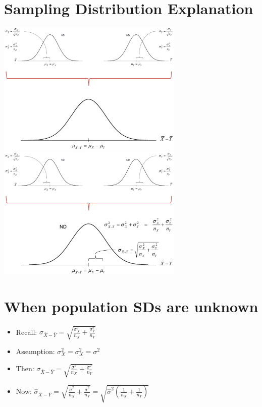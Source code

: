 \documentclass[12pt]{article}
\begin{document}
\section{Sampling Distribution
Explanation}\label{sampling-distribution-explanation}

\includegraphics[width=3.5in]{samp_dist_2samp_comb.png}
\includegraphics[width=3.5in]{samp_dist_2samp_comb_all.png}

\section{When population SDs are
unknown}\label{when-population-sds-are-unknown}

\begin{itemize}
\itemsep1pt\parskip0pt
\item
  Recall:
  \(\sigma_{\bar{X} - \bar{Y}} = \sqrt{\frac{\sigma_{X}^{2}}{n_{X}} + \frac{\sigma_{Y}^{2}}{n_{Y}}}\)
\item
  Assumption: \(\sigma_{X}^{2} = \sigma^2_{X} = \sigma^2\)
\item
  Then:
  \(\sigma_{\bar{X} - \bar{Y}} = \sqrt{\frac{\sigma^{2}}{n_{X}} + \frac{\sigma^{2}}{n_{Y}}}\)
\item
  Now:
  \(\hat{\sigma}_{\bar{X} - \bar{Y}} = \sqrt{\frac{\hat{\sigma}^{2}}{n_{X}} + \frac{\hat{\sigma}^{2}}{n_{Y}}} = \sqrt{\hat{\sigma}^2\left(\frac{1}{n_{X}} + \frac{1}{n_{Y}}\right)}\)
\end{itemize}
\end{document}
